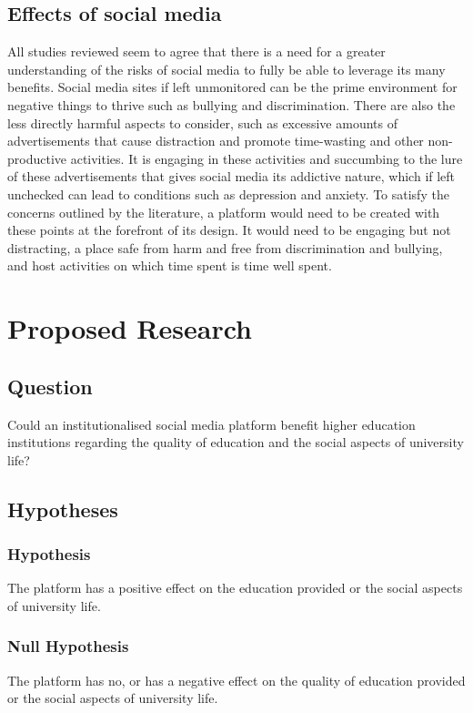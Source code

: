\documentclass[lettersize,journal]{IEEEtran}
\begin{document}
	\subsection{Effects of social media}
	All studies reviewed seem to agree that there is a need for a greater understanding of the risks of social media to fully
	 be able to leverage its many benefits. Social media sites if left unmonitored can be the prime environment for negative things to thrive 
	 such as bullying and discrimination. There are also the less directly harmful aspects to consider, such as excessive amounts of advertisements that 
	 cause distraction and promote time-wasting and other non-productive activities. It is engaging in these activities and succumbing to the lure of
	 these advertisements that gives social media its addictive nature, which if left unchecked can lead to conditions such as depression and anxiety.
	 To satisfy the concerns outlined by the literature, a platform would need to be created with these points at the forefront of its design.
	 It would need to be engaging but not distracting, a place safe from harm and free from discrimination and bullying, and host activities on
	 which time spent is time well spent.
	 \section{Proposed Research}
	\subsection{Question}
	    Could an institutionalised social media platform benefit higher education institutions regarding the quality of
	    education and the social aspects of university life?

	\subsection{Hypotheses}
		\subsubsection{Hypothesis}
   		 The platform has a positive effect on the education provided or the social
    		 aspects of university life.


		\subsubsection{Null Hypothesis}
		The platform has no, or has a negative effect on the quality of education provided or the
    		social aspects of university life.
\end{document}
